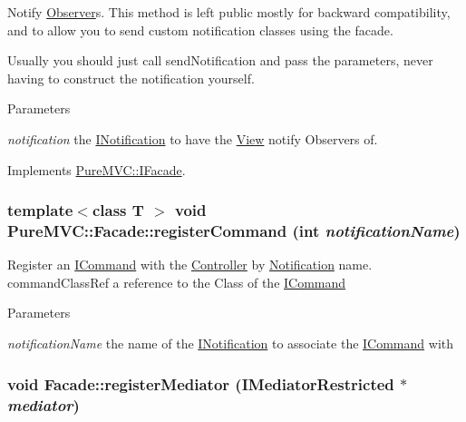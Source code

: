 Notify {\ttfamily \hyperlink{class_pure_m_v_c_1_1_observer}{Observer}}s. This method is left public mostly for backward compatibility, and to allow you to send custom notification classes using the facade. 

Usually you should just call sendNotification and pass the parameters, never having to construct the notification yourself.


\begin{DoxyParams}{Parameters}
\item[{\em notification}]the {\ttfamily \hyperlink{class_pure_m_v_c_1_1_i_notification}{INotification}} to have the {\ttfamily \hyperlink{class_pure_m_v_c_1_1_view}{View}} notify {\ttfamily Observers} of. \end{DoxyParams}


Implements \hyperlink{class_pure_m_v_c_1_1_i_facade_acd9023ead1da9b309b3e85406cbc428b}{PureMVC::IFacade}.\hypertarget{class_pure_m_v_c_1_1_facade_ab89d2e427b3936fc6c57be7a9f25b3d1}{
\subsubsection[{registerCommand}]{\setlength{\rightskip}{0pt plus 5cm}template$<$class T $>$ void PureMVC::Facade::registerCommand (int {\em notificationName})}}
\label{class_pure_m_v_c_1_1_facade_ab89d2e427b3936fc6c57be7a9f25b3d1}


Register an {\ttfamily \hyperlink{class_pure_m_v_c_1_1_i_command}{ICommand}} with the {\ttfamily \hyperlink{class_pure_m_v_c_1_1_controller}{Controller}} by \hyperlink{class_pure_m_v_c_1_1_notification}{Notification} name. commandClassRef a reference to the Class of the {\ttfamily \hyperlink{class_pure_m_v_c_1_1_i_command}{ICommand}} 
\begin{DoxyParams}{Parameters}
\item[{\em notificationName}]the name of the {\ttfamily \hyperlink{class_pure_m_v_c_1_1_i_notification}{INotification}} to associate the {\ttfamily \hyperlink{class_pure_m_v_c_1_1_i_command}{ICommand}} with \end{DoxyParams}
\hypertarget{class_pure_m_v_c_1_1_facade_a3c0ead374ba222146a7fe5a59eb0fcb4}{
\subsubsection[{registerMediator}]{\setlength{\rightskip}{0pt plus 5cm}void Facade::registerMediator ({\bf IMediatorRestricted} $\ast$ {\em mediator})}}
\label{class_pure_m_v_c_1_1_facade_a3c0ead374ba222146a7fe5a59eb0fcb4}


